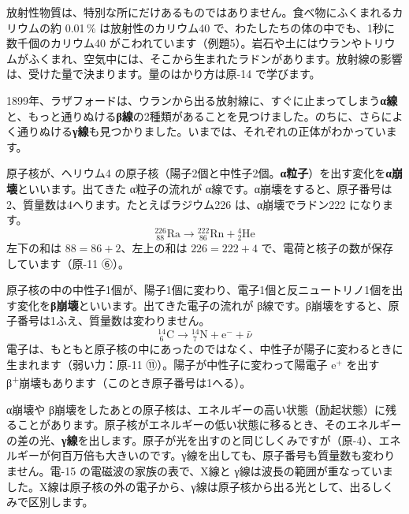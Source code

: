 \begin{phmijika}
放射性物質は、特別な所にだけあるものではありません。食べ物にふくまれるカリウムの約 0.01\,\% は放射性のカリウム40 で、わたしたちの体の中でも、1秒に数千個のカリウム40 がこわれています（例題5）。岩石や土にはウランやトリウムがふくまれ、空気中には、そこから生まれたラドンがあります。放射線の影響は、受けた量で決まります。量のはかり方は原-14 で学びます。
\end{phmijika}

\label{ph:原-12:sec2}
1899年、ラザフォードは、ウランから出る放射線に、すぐに止まってしまう\textbf{α線}と、もっと通りぬける\textbf{β線}の2種類があることを見つけました。のちに、さらによく通りぬける\textbf{γ線}も見つかりました。いまでは、それぞれの正体がわかっています。

\label{ph:原-12:alpha}原子核が、ヘリウム4 の原子核（陽子2個と中性子2個。\textbf{α粒子}）を出す変化を\textbf{α崩壊}といいます。出てきた α粒子の流れが α線です。α崩壊をすると、原子番号は2、質量数は4へります。たとえばラジウム226 は、α崩壊でラドン222 になります。
\[ {}^{226}_{\ 88}\mathrm{Ra}\longrightarrow{}^{222}_{\ 86}\mathrm{Rn}+{}^{4}_{2}\mathrm{He} \]
左下の和は $88=86+2$、左上の和は $226=222+4$ で、電荷と核子の数が保存しています（原-11 ⑥）。

原子核の中の中性子1個が、陽子1個に変わり、電子1個と反ニュートリノ1個を出す変化を\textbf{β崩壊}といいます。出てきた電子の流れが β線です。β崩壊をすると、原子番号は1ふえ、質量数は変わりません。
\[ {}^{14}_{\ 6}\mathrm{C}\longrightarrow{}^{14}_{\ 7}\mathrm{N}+\mathrm e^-+\bar\nu \]
電子は、もともと原子核の中にあったのではなく、中性子が陽子に変わるときに生まれます（弱い力：原-11 ⑪）。陽子が中性子に変わって陽電子 e$^+$ を出す β\textsuperscript{+}崩壊もあります（このとき原子番号は1へる）。

α崩壊や β崩壊をしたあとの原子核は、エネルギーの高い状態（励起状態）に残ることがあります。原子核がエネルギーの低い状態に移るとき、そのエネルギーの差の光、\textbf{γ線}を出します。原子が光を出すのと同じしくみですが（原-4）、エネルギーが何百万倍も大きいのです。γ線を出しても、原子番号も質量数も変わりません。電-15 の電磁波の家族の表で、X線と γ線は波長の範囲が重なっていました。X線は原子核の外の電子から、γ線は原子核から出る光として、出るしくみで区別します。

